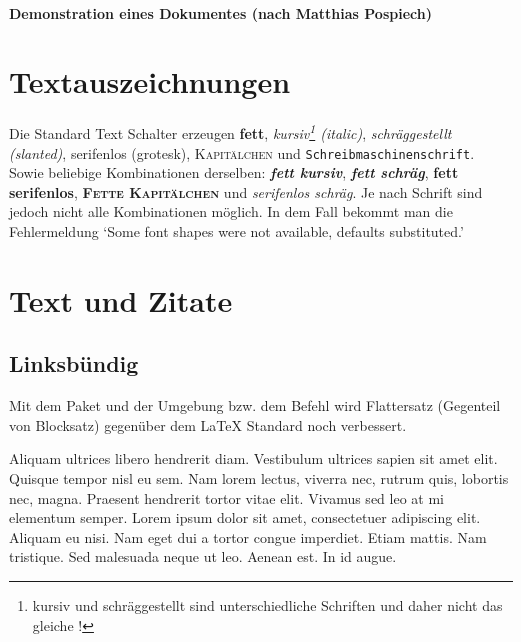 \paragraph{{\LARGE Demonstration eines Dokumentes (nach Matthias Pospiech)}}

\section{Textauszeichnungen}

Die Standard Text Schalter erzeugen
\textbf{fett},
\textit{kursiv\footnote{kursiv und schräggestellt sind unterschiedliche Schriften und daher nicht das gleiche !} (italic)},
\textsl{schräggestellt (slanted)},
\textsf{serifenlos (grotesk)},
\textsc{Kapitälchen} und
\texttt{Schreibmaschinenschrift}.
Sowie beliebige Kombinationen derselben:
\textit{\textbf{fett kursiv}},
\textsl{\textbf{fett schräg}},
\textsf{\textbf{fett serifenlos}},
\textsc{\textbf{Fette Kapitälchen}}
und
\textsl{\textsf{serifenlos schräg}}. Je nach Schrift sind jedoch nicht alle Kombinationen möglich. In dem Fall bekommt man die Fehlermeldung `Some font shapes were not available, defaults substituted.'


\section{Text und Zitate}
\subsection{Linksbündig}
%
Mit dem Paket  und der Umgebung  bzw. dem Befehl  wird Flattersatz (Gegenteil von Blocksatz) gegenüber dem \LaTeX{} Standard noch verbessert.

\begin{FlushLeft}
Aliquam ultrices libero hendrerit diam. Vestibulum ultrices sapien sit amet elit. Quisque tempor nisl eu sem. Nam lorem lectus, viverra nec, rutrum quis, lobortis nec, magna. Praesent hendrerit tortor vitae elit. Vivamus sed leo at mi elementum semper. Lorem ipsum dolor sit amet, consectetuer adipiscing elit. Aliquam eu nisi. Nam eget dui a tortor congue imperdiet. Etiam mattis. Nam tristique. Sed malesuada neque ut leo. Aenean est. In id augue.
\end{FlushLeft}
